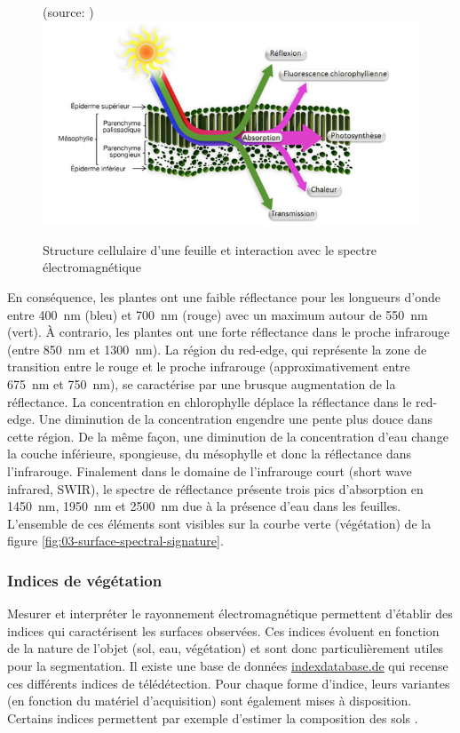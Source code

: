 \documentclass[../thesis.tex]{subfiles}
\begin{document}
    \begin{figure}[H]
        \centering
        {\scriptsize (source: \cite{ben2016utilisation})} \\
        \includegraphics[width=0.6\linewidth]{img/biblio/plant-cellular-structure}
        \caption{Structure cellulaire d'une feuille et interaction avec le spectre électromagnétique}
        \label{fig:03-plant-cellular-structure}
    \end{figure}
    
    \par En conséquence, les plantes ont une faible réflectance pour les longueurs d'onde entre \SI{400}{nm} (bleu) et \SI{700}{nm} (rouge) avec un maximum autour de \SI{550}{nm} (vert). À contrario, les plantes ont une forte réflectance dans le proche infrarouge (entre \SI{850}{nm} et \SI{1300}{nm}). La région du red-edge, qui représente la zone de transition entre le rouge et le proche infrarouge (approximativement entre \SI{675}{nm} et \SI{750}{nm}), se caractérise par une brusque augmentation de la réflectance. La concentration en chlorophylle déplace la réflectance dans le red-edge. Une diminution de la concentration engendre une pente plus douce dans cette région. De la même façon, une diminution de la concentration d'eau change la couche inférieure, spongieuse, du mésophylle et donc la réflectance dans l'infrarouge. Finalement dans le domaine de l'infrarouge court (short wave infrared, SWIR), le spectre de réflectance présente trois pics d'absorption en \SI{1450}{nm}, \SI{1950}{nm} et \SI{2500}{nm} due à la présence d'eau dans les feuilles. L'ensemble de ces éléments sont visibles sur la courbe verte (végétation) de la figure \ref{fig:03-surface-spectral-signature}. 
    
    \subsubsection{Indices de végétation} Mesurer et interpréter le rayonnement électromagnétique permettent d'établir des indices qui caractérisent les surfaces observées. Ces indices évoluent en fonction de la nature de l'objet (sol, eau, végétation) et sont donc particulièrement utiles pour la segmentation. Il existe une base de données \url{indexdatabase.de} qui recense ces différents indices de télédétection. Pour chaque forme d'indice, leurs variantes (en fonction du matériel d'acquisition) sont également mises à disposition. Certains indices permettent par exemple d'estimer la composition des sols \cite{Dhawale2021}.
    
\end{document}
